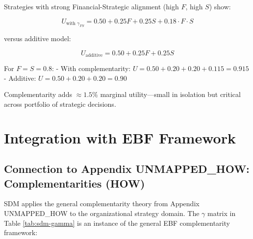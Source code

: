 Strategies with strong Financial-Strategic alignment (high $F$, high $S$) show:

\begin{equation}
U_{\text{with } \gamma_{FS}} = 0.50 + 0.25F + 0.25S + 0.18 \cdot F \cdot S
\end{equation}

versus additive model:

\begin{equation}
U_{\text{additive}} = 0.50 + 0.25F + 0.25S
\end{equation}

For $F = S = 0.8$:
- With complementarity: $U = 0.50 + 0.20 + 0.20 + 0.115 = 0.915$
- Additive: $U = 0.50 + 0.20 + 0.20 = 0.90$

Complementarity adds $\approx 1.5\%$ marginal utility---small in isolation but critical across portfolio of strategic decisions.

\section{Integration with EBF Framework}
\label{sec:sdm-integration}

\subsection{Connection to Appendix UNMAPPED_HOW: Complementarities (HOW)}

SDM applies the general complementarity theory from Appendix UNMAPPED_HOW to the organizational strategy domain. The $\gamma$ matrix in Table \ref{tab:sdm-gamma} is an instance of the general EBF complementarity framework:

